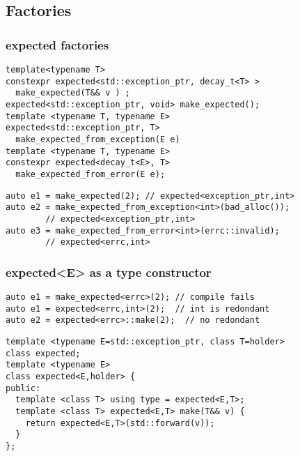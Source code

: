 \documentclass[xcolor=dvipsnames]{beamer}
\begin{document}
\subsection{Factories}
\begin{frame}[fragile]
\frametitle{expected factories}

\begin{lstlisting}
template<typename T>
constexpr expected<std::exception_ptr, decay_t<T> > 
  make_expected(T&& v ) ;
expected<std::exception_ptr, void> make_expected();
template <typename T, typename E>
expected<std::exception_ptr, T> 
  make_expected_from_exception(E e)
template <typename T, typename E>
constexpr expected<decay_t<E>, T> 
  make_expected_from_error(E e);
\end{lstlisting}

\begin{lstlisting}
auto e1 = make_expected(2); // expected<exception_ptr,int>
auto e2 = make_expected_from_exception<int>(bad_alloc()); 
		// expected<exception_ptr,int>
auto e3 = make_expected_from_error<int>(errc::invalid); 
		// expected<errc,int>
\end{lstlisting}
\end{frame}
\begin{frame}[fragile]
\frametitle{expected<E> as a type constructor}

\begin{lstlisting}
auto e1 = make_expected<errc>(2); // compile fails
auto e1 = expected<errc,int>(2);  // int is redondant
auto e2 = expected<errc>::make(2);  // no redondant
\end{lstlisting}

\begin{lstlisting}
template <typename E=std::exception_ptr, class T=holder>
class expected;
template <typename E>
class expected<E,holder> {
public:
  template <class T> using type = expected<E,T>;
  template <class T> expected<E,T> make(T&& v) {
    return expected<E,T>(std::forward(v));
  }
};
\end{lstlisting}
\end{frame}
\end{document}
